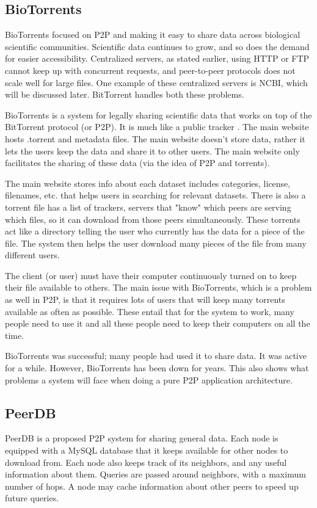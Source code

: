 \documentclass[acmsmall]{acmart}
\begin{document}
\subsection{BioTorrents}
BioTorrents focused on P2P and making it easy to share data across biological scientific communities.  Scientific data continues to grow, and so does the demand for easier accessibility. Centralized servers, as stated earlier, using HTTP or FTP cannot keep up with concurrent requests, and peer-to-peer protocols does not scale well for large files.\cite{biotorrents} One example of these centralized servers is NCBI, which will be discussed later. BitTorrent handles both these problems. 

BioTorrents is a system for legally sharing scientific data that works on top of the BitTorrent protocol (or P2P). It is much like a public tracker \cite{biotorrents}. The main website hosts .torrent and metadata files. The main website doesn't store data, rather it lets the users keep the data and share it to other users. The main website only facilitates the sharing of these data (via the idea of P2P and torrents).

The main website stores info about each dataset includes categories, license, filenames, etc. that helps users in searching for relevant datasets. There is also a torrent file has a list of trackers, servers that "know" which peers are serving which files, so it can download from those peers simultaneously. These torrents act like a directory telling the user who currently has the data for a piece of the file. The system then helps the user download many pieces of the file from many different users.

The client (or user) must have their computer continuously turned on to keep their file available to others. The main issue with BioTorrents, which is a problem as well in P2P, is that it requires lots of users that will keep many torrents available as often as possible.\cite{biotorrents} These entail that for the system to work, many people need to use it and all these people need to keep their computers on all the time.

BioTorrents was successful; many people had used it to share data. It was active for a while. However, BioTorrents has been down for years. This also shows what problems a system will face when doing a pure P2P application architecture.

\subsection{PeerDB}
PeerDB is a proposed P2P system for sharing general data. Each node is equipped with a MySQL database that it keeps available for other nodes to download from. Each node also keeps track of its neighbors, and any useful information about them. Queries are passed around neighbors, with a maximum number of hops. A node may cache information about other peers to speed up future queries.
\cite{peerdb}
\end{document}
